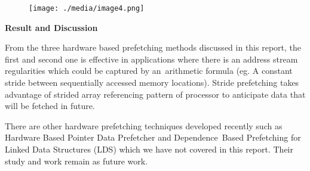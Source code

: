 \documentclass[12pt]{article}
\begin{document}

\begin{figure}[H]
\advance\leftskip 0.17in		\texttt{[image: ./media/image4.png]}
\end{figure}



\par

{\fontsize{20pt}{24.0pt}\selectfont \textbf{\textcolor[HTML]{222222}{Result and Discussion}}\par}\par


\vspace{\baselineskip}
{\fontsize{15pt}{18.0pt}\selectfont \textcolor[HTML]{222222}{From the three hardware based prefetching methods discussed in this report, the first and second one is effective in applications where there is an address stream regularities which could be captured by an\ arithmetic formula  (eg. A constant stride between sequentially accessed memory locations). Stride prefetching takes advantage of strided array referencing pattern of processor to anticipate data that will be fetched in future.}\par}\par


\vspace{\baselineskip}
{\fontsize{15pt}{18.0pt}\selectfont \textcolor[HTML]{222222}{There are other hardware prefetching techniques developed recently such as }Hardware Based Pointer Data Prefetcher and Dependence\ Based Prefetching for Linked Data Structures (LDS)  which we have not covered in this report. Their study and work remain as future work.\par}\par


\printbibliography
\end{document}
